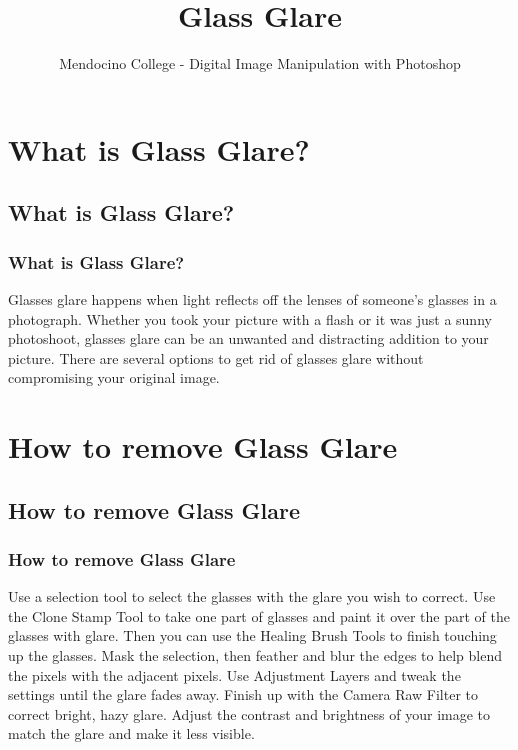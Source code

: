 \documentclass{beamer}
\title{Glass Glare}
\author{Mendocino College - Digital Image Manipulation with Photoshop}
\date{\vspace{-5em}}
\begin{document}
	{
		\begin{frame}
			\vspace{-35pt}
			\maketitle
		\end{frame}
	}
		
		
\section{What is Glass Glare?}

\subsection{What is Glass Glare?}		

	\begin{frame}
		\frametitle{What is Glass Glare?}
		\begin{outline}
			\1 Glasses glare happens when light reflects off the lenses of someone’s glasses in a photograph. 
			\1 Whether you took your picture with a flash or it was just a sunny photoshoot, glasses glare can be an unwanted and distracting addition to your picture. 
			\1 There are several options to get rid of glasses glare without compromising your original image. 
		\end{outline}
	\end{frame}

\section{How to remove Glass Glare}
\subsection{How to remove Glass Glare}
	\begin{frame}
	\frametitle{How to remove Glass Glare}
	\begin{outline}
		\1 Use a selection tool to select the glasses with the glare you wish to correct.
		\1 Use the Clone Stamp Tool to take one part of glasses and paint it over the part of the glasses with glare.
		\1 Then you can use the Healing Brush Tools to finish touching up the glasses.
		\1 Mask the selection, then feather and blur the edges to help blend the pixels with the adjacent pixels.
		\1 Use Adjustment Layers and tweak the settings until the glare fades away.
		\1 Finish up with the Camera Raw Filter to correct bright, hazy glare.  
		\2 Adjust the contrast and brightness of your image to match the glare and make it less visible.  
	\end{outline}
\end{frame}
\end{document}
